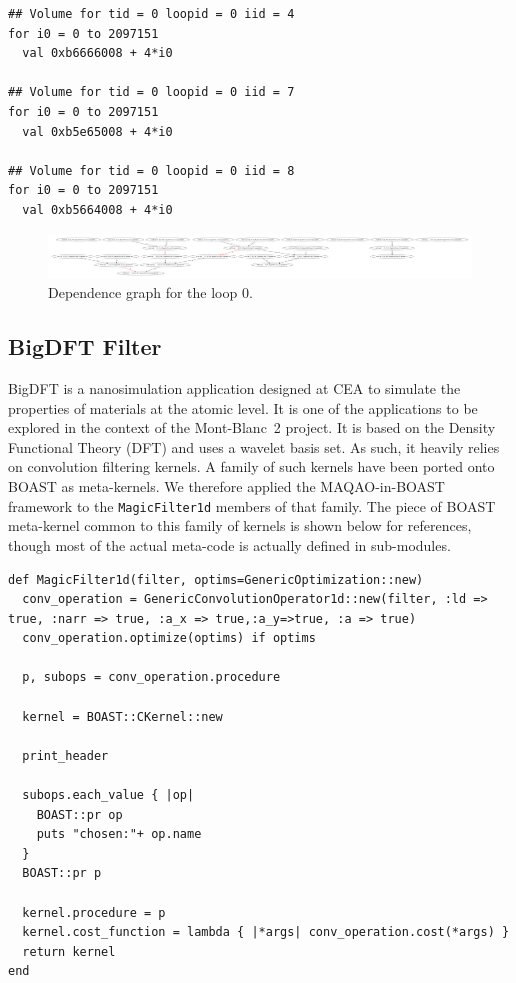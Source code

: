 \documentclass[11pt, a4paper, twoside]{montblanc2}
\begin{document}
\begin{verbatim}
## Volume for tid = 0 loopid = 0 iid = 4
for i0 = 0 to 2097151
  val 0xb6666008 + 4*i0

## Volume for tid = 0 loopid = 0 iid = 7
for i0 = 0 to 2097151
  val 0xb5e65008 + 4*i0

## Volume for tid = 0 loopid = 0 iid = 8
for i0 = 0 to 2097151
  val 0xb5664008 + 4*i0
\end{verbatim}

\begin{figure}[h]
  \centering
\includegraphics[width=1\textwidth]{fvector_add_l0}
\caption{Dependence graph for the loop 0.}\label{fig:dg_vec_add}
\end{figure}

  \subsection{BigDFT Filter}

  BigDFT is a nanosimulation application designed at CEA to simulate the 
  properties of materials at the atomic level. It is one of the applications to 
  be explored in the context of the Mont-Blanc~2 project.
  It is based on the Density Functional Theory (DFT) and uses a wavelet basis 
  set. As such, it heavily relies on convolution filtering kernels. A family of 
  such kernels have been ported onto BOAST as meta-kernels. We therefore applied 
  the MAQAO-in-BOAST framework to the \texttt{MagicFilter1d} members of that 
  family. The piece of BOAST meta-kernel common to this family of kernels 
  is shown below for references, though most of the actual meta-code is actually defined 
  in sub-modules.

\begin{lstlisting}[style=BOAST]
def MagicFilter1d(filter, optims=GenericOptimization::new)
  conv_operation = GenericConvolutionOperator1d::new(filter, :ld => true, :narr => true, :a_x => true,:a_y=>true, :a => true)
  conv_operation.optimize(optims) if optims

  p, subops = conv_operation.procedure

  kernel = BOAST::CKernel::new

  print_header

  subops.each_value { |op|
    BOAST::pr op
    puts "chosen:"+ op.name
  }
  BOAST::pr p

  kernel.procedure = p
  kernel.cost_function = lambda { |*args| conv_operation.cost(*args) }
  return kernel
end
\end{lstlisting}
\end{document}
